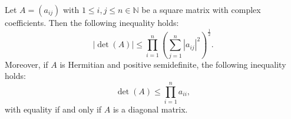\documentclass[12pt]{article}
\begin{document}
Let $A=(a_{ij})$ with $1\leq i,j\leq n\in\mathbb{N}$ be a square matrix with complex coefficients. Then the following inequality holds:
$$|\det(A)|\leq \prod_{i=1}^n\left(\sum_{j=1}^n|a_{ij}|^2\right)^\frac{1}{2}.$$
Moreover, if $A$ is Hermitian and positive semidefinite, the following inequality holds:
$$\det(A)\leq \prod_{i=1}^n a_{ii},$$
with equality if and only if $A$ is a diagonal matrix.
\end{document}
